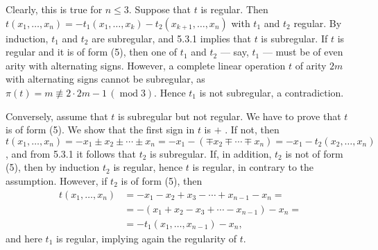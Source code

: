 \documentclass[a4paper,reqno]{amsart}\usepackage{amssymb,latexsym}
\theoremstyle{definition}
\theoremstyle{remark}
\numberwithin{equation}{section}
\numberwithin{theorem}{section}
\begin{document}
\smallskip

Clearly, this is true for $n\leq3$. Suppose that $t$ is regular. Then
$t(x_{1},\ldots,x_{n})=-t_{1}(x_{1},\ldots,x_{k})-t_{2}(x_{k+1},\ldots,x_{n})$
with $t_{1}$ and $t_{2}$ regular. By induction, $t_{1}$ and $t_{2}$ are
subregular, and 5.3.1 implies that $t$ is subregular. If $t$ is regular and it
is of form (5), then one of $t_{1}$ and $t_{2}$ --- say, $t_{1}$ --- must be
of even arity with alternating signs. However, a complete linear operation $t$
of arity $2m$ with alternating signs cannot be subregular, as $\pi
(t)=m\not \equiv 2\cdot2m-1\,(\operatorname{mod}3)$. Hence $t_{1}$ is not
subregular, a contradiction.

Conversely, assume that $t$ is subregular but not regular. We have to prove
that $t$ is of form (5). We show that the first sign in $t$ is $+$ . If not,
then $t(x_{1},\ldots,x_{n})=-x_{1}\pm x_{2}\pm\cdots\pm x_{n}=-x_{1}-(\mp
x_{2}\mp\cdots\mp x_{n})=-x_{1}-t_{2}(x_{2},\ldots,x_{n})$, and from 5.3.1 it
follows that $t_{2}$ is subregular. If, in addition, $t_{2}$ is not of form
(5), then by induction $t_{2}$ is regular, hence $t$ is regular, in contrary
to the assumption. However, if $t_{2}$ is of form (5), then\begin{align*}
t(x_{1},\ldots,x_{n})  &  =-x_{1}-x_{2}+x_{3}-\cdots+x_{n-1}-x_{n}=\\
&  =-(x_{1}+x_{2}-x_{3}+\cdots-x_{n-1})-x_{n}=\\
&  =-t_{1}(x_{1},\ldots,x_{n-1})-x_{n},
\end{align*}
and here $t_{1}$ is regular, implying again the regularity of $t$.
\end{document}
